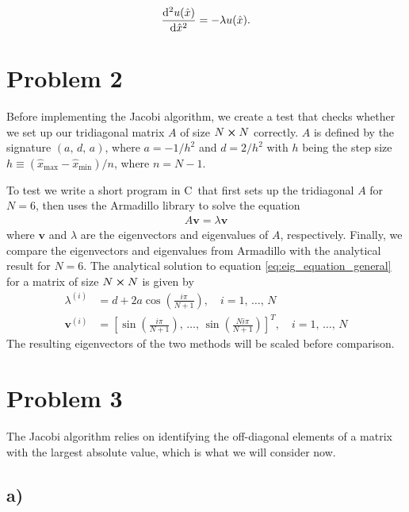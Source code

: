 \documentclass[english,notitlepage,nofootinbib]{revtex4-1}  %
\newcommand{\CC}{C\nolinebreak\hspace{-.05em}\raisebox{.4ex}{\tiny\bf +}\nolinebreak\hspace{-.10em}\raisebox{.4ex}{\tiny\bf +}}
\renewcommand{\vec}{\mathbf}
\newcommand{\hx}{\hat{x}}
\newcommand{\closed}[1]{\left( #1 \right)}
\newcommand{\bracket}[1]{\left[ #1 \right]}
\begin{document}
\begin{align}\label{p1_scaled_eq}
    \dv[2]{u(\hat{x})}{\hat{x}} = -\lambda u(\hat{x}).
\end{align}


\section*{Problem 2}
Before implementing the Jacobi algorithm, we create a test that checks whether we set up our tridiagonal matrix $A$ of size $N\cross N$ correctly. $A$ is defined by the signature $(a,\,d,\,a)$, where $a=-1/h^2$ and $d=2/h^2$ with $h$ being the step size $h \equiv(\hx_\mathrm{max}-\hx_\mathrm{min})/n$, where $n=N-1$. 

To test we write a short program in \CC\, that first sets up the tridiagonal $A$ for $N=6$, then uses the Armadillo library to solve the equation
\begin{align}
    A\vec{v} = \lambda \vec{v} \label{eq:eig_equation_general}
\end{align} 
where $\vec{v}$ and $\lambda$ are the eigenvectors and eigenvalues of $A$, respectively. Finally, we compare the eigenvectors and eigenvalues from Armadillo with the analytical result for $N=6$. The analytical solution to equation \eqref{eq:eig_equation_general} for a matrix of size $N\cross N$ is given by  
\begin{align}
    \lambda^{(i)} &= d + 2a \cos\closed{\frac{i\pi}{N+1}},\quad i=1,\,\dots,\,N \\
    \vec{v}^{(i)} &= \bracket{ \sin\closed{\frac{i\pi}{N+1}},\,\dots,\,\sin\closed{\frac{Ni\pi}{N+1}} }^T ,\quad i=1,\,\dots,\,N
\end{align} 
The resulting eigenvectors of the two methods will be scaled before comparison. 

\section*{Problem 3}
The Jacobi algorithm relies on identifying the off-diagonal elements of a matrix with the largest absolute value, which is what we will consider now. 
\subsection*{a)}
\end{document}
